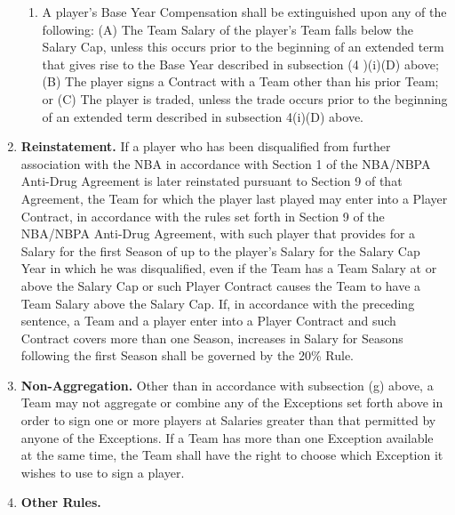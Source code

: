 \documentclass[
]{book}
\begin{document}
\begin{enumerate}
\begin{enumerate}
  \item
    A player's Base Year Compensation shall be extinguished upon any of the following:
    (A) The Team Salary of the player's Team falls below the Salary Cap, unless this occurs prior to the beginning of an extended term that gives rise to the Base Year described in subsection (4 )(i)(D) above;
    (B) The player signs a Contract with a Team other than his prior Team; or
    (C) The player is traded, unless the trade occurs prior to the beginning of an extended term described in subsection 4(i)(D) above.
  \end{enumerate}
\item
  \textbf{Reinstatement.} If a player who has been disqualified from further association with the NBA in accordance with Section 1 of the NBA/NBPA Anti-Drug Agreement is later reinstated pursuant to Section 9 of that Agreement, the Team for which the player last played may enter into a Player Contract, in accordance with the rules set forth in Section 9 of the NBA/NBPA Anti-Drug Agreement, with such player that provides for a Salary for the first Season of up to the player's Salary for the Salary Cap Year in which he was disqualified, even if the Team has a Team Salary at or above the Salary Cap or such Player Contract causes the Team to have a Team Salary above the Salary Cap. If, in accordance with the preceding sentence, a Team and a player enter into a Player Contract and such Contract covers more than one Season, increases in Salary for Seasons following the first Season shall be governed by the 20\% Rule.
\item
  \textbf{Non-Aggregation.} Other than in accordance with subsection (g) above, a Team may not aggregate or combine any of the Exceptions set forth above in order to sign one or more players at Salaries greater than that permitted by anyone of the Exceptions. If a Team has more than one Exception available at the same time, the Team shall have the right to choose which Exception it wishes to use to sign a player.
\item
  \textbf{Other Rules.}


\end{enumerate}
\end{document}
